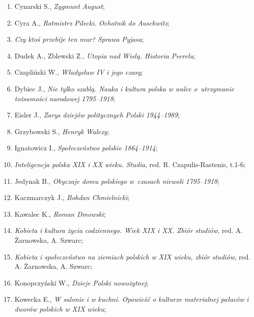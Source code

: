 \documentclass[a4paper,11pt]{article}
\begin{document}
\begin{enumerate}
\item Cynarski S., \emph{Zygmunt August};

\item Cyra A., \emph{Rotmistrz Pilecki. Ochotnik do Auschwitz};

\item \emph{Czy ktoś przebije ten mur? Sprawa Pyjasa};

\item Dudek A., Zblewski Z., \emph{Utopia nad Wisłą. Historia
    Peerelu};

\item Czapliński W., \emph{Władysław IV i jego czasy};

\item Dybiec J., \emph{Nie tylko szablą. Nauka i kultura polska w
    walce o~utrzymanie tożsamości narodowej 1795--1918};

\item Eisler J., \emph{Zarys dziejów politycznych Polski 1944--1989};

\item Grzybowski S., \emph{Henryk Walezy};

\item Ignatowicz I., \emph{Społeczeństwo polskie 1864--1914};

\item \emph{Inteligencja polska XIX i XX wieku. Studia}, red. R.
  Czapulis-Rastenis, t.1-6;

\item Jedynak B., \emph{Obyczaje domu polskiego w~czasach niewoli
    1795--1918};

\item Kaczmarczyk J., \emph{Bohdan Chmielnicki};

\item Kawalec K., \emph{Roman Dmowski};

\item \emph{Kobieta i kultura życia codziennego. Wiek XIX i XX. Zbiór
    studiów}, red. A. Żarnowska, A. Szwarc;

\item \emph{Kobieta i społeczeństwo na ziemiach polskich w XIX wieku,
    zbiór studiów}, red. A. Żarnowska, A. Szwarc;

\item Konopczyński W., \emph{Dzieje Polski nowożytnej};

\item Kowecka E., \emph{W salonie i w kuchni. Opowieść o kulturze
    materialnej pałaców i dworów polskich w XIX wieku};


\end{enumerate}
\end{document}
